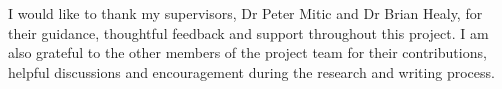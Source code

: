 \documentclass[12pt,a4paper,oneside]{book}
\begin{document}
I would like to thank my supervisors, Dr Peter Mitic and Dr Brian Healy, for
their guidance, thoughtful feedback and support throughout this project. I am
also grateful to the other members of the project team for their contributions,
helpful discussions and encouragement during the research and writing process.

\clearpage
\tableofcontents
\clearpage
{}
{}
\listoffigures
\clearpage
{}
{}
\listoftables

\mainmatter







\clearpage
{}
{}
\begingroup
{}


\endgroup

\ifdefined\withoutappendices
\else
  \begin{appendices}
  
  
  
  \end{appendices}
\fi
\end{document}
